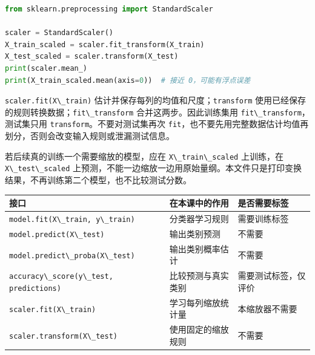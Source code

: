 \documentclass[UTF8,a4paper,11pt,fontset=fandol]{ctexart}
\providecommand{\passthrough}[1]{#1}
\begin{document}
\begin{lstlisting}[language=Python]
from sklearn.preprocessing import StandardScaler

scaler = StandardScaler()
X_train_scaled = scaler.fit_transform(X_train)
X_test_scaled = scaler.transform(X_test)
print(scaler.mean_)
print(X_train_scaled.mean(axis=0))  # 接近 0，可能有浮点误差
\end{lstlisting}

\passthrough{\lstinline!scaler.fit(X\_train)!} 估计并保存每列的均值和尺度；\passthrough{\lstinline!transform!} 使用已经保存的规则转换数据；\passthrough{\lstinline!fit\_transform!} 合并这两步。因此训练集用 \passthrough{\lstinline!fit\_transform!}，测试集只用 \passthrough{\lstinline!transform!}。不要对测试集再次 \passthrough{\lstinline!fit!}，也不要先用完整数据估计均值再划分，否则会改变输入规则或泄漏测试信息。

若后续真的训练一个需要缩放的模型，应在 \passthrough{\lstinline!X\_train\_scaled!} 上训练，在 \passthrough{\lstinline!X\_test\_scaled!} 上预测，不能一边缩放一边用原始量纲。本文件只是打印变换结果，不再训练第二个模型，也不比较测试分数。

\begin{longtable}[]{@{}
  >{\raggedright\arraybackslash}p{}
  >{\raggedright\arraybackslash}p{}
  >{\raggedright\arraybackslash}p{}@{}}
\toprule\noalign{}
\begin{minipage}[b]{\linewidth}\raggedright
接口
\end{minipage} & \begin{minipage}[b]{\linewidth}\raggedright
在本课中的作用
\end{minipage} & \begin{minipage}[b]{\linewidth}\raggedright
是否需要标签
\end{minipage} \\
\midrule\noalign{}
\endhead
\bottomrule\noalign{}
\endlastfoot
\passthrough{\lstinline!model.fit(X\_train, y\_train)!} & 分类器学习规则 & 需要训练标签 \\
\passthrough{\lstinline!model.predict(X\_test)!} & 输出类别预测 & 不需要 \\
\passthrough{\lstinline!model.predict\_proba(X\_test)!} & 输出类别概率估计 & 不需要 \\
\passthrough{\lstinline!accuracy\_score(y\_test, predictions)!} & 比较预测与真实类别 & 需要测试标签，仅评价 \\
\passthrough{\lstinline!scaler.fit(X\_train)!} & 学习每列缩放统计量 & 本缩放器不需要 \\
\passthrough{\lstinline!scaler.transform(X\_test)!} & 使用固定的缩放规则 & 不需要 \\
\end{longtable}
\end{document}
